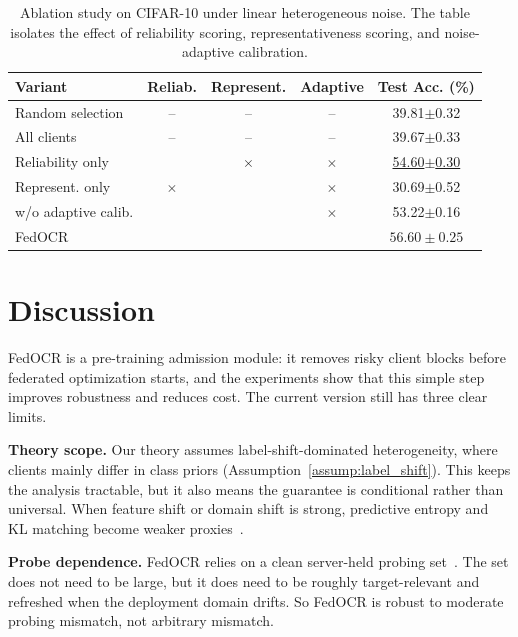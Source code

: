 ﻿\documentclass[conference]{IEEEtran}
\theoremstyle{definition}
\theoremstyle{remark}
\begin{document}
\begin{table}[h]
	\centering
	\caption{\normalfont Ablation study on CIFAR-10 under linear heterogeneous noise. The table isolates the effect of reliability scoring, representativeness scoring, and noise-adaptive calibration.}
	\label{tab:ablation_fedraa}
	\setlength{\tabcolsep}{2pt}
	\renewcommand{\arraystretch}{1.15}
	\begin{tabular}{lcccc}
		\toprule
		\textbf{Variant} 
		& \textbf{Reliab.} 
		& \textbf{Represent.} 
		& \textbf{Adaptive} 
		& \textbf{Test Acc. (\%)} \\
		\midrule
		
		Random selection     & -- & -- & -- & 39.81$\pm$0.32 \\
		All clients          & -- & -- & -- & 39.67$\pm$0.33 \\
		Reliability only     & \checkmark & $\times$ & $\times$ & \underline{54.60$\pm$0.30} \\
		Represent. only      & $\times$ & \checkmark & $\times$ & 30.69$\pm$0.52 \\
		w/o adaptive calib.  & \checkmark & \checkmark & $\times$ & 53.22$\pm$0.16 \\
		\midrule
		FedOCR               & \checkmark & \checkmark & \checkmark & $\boldsymbol{56.60\pm0.25}$ \\
		
		\bottomrule
	\end{tabular}
\end{table}
\section{Discussion}

FedOCR is a pre-training admission module: it removes risky client blocks before federated optimization starts, and the experiments show that this simple step improves robustness and reduces cost. The current version still has three clear limits.

\textbf{Theory scope.} Our theory assumes label-shift-dominated heterogeneity, where clients mainly differ in class priors (Assumption~\ref{assump:label_shift}). This keeps the analysis tractable, but it also means the guarantee is conditional rather than universal. When feature shift or domain shift is strong, predictive entropy and KL matching become weaker proxies~\cite{northcutt2021confident,guo2017calibration,ben2010theory,lipton2018labelshift}.

\textbf{Probe dependence.} FedOCR relies on a clean server-held probing set~\cite{mcmahan2017communication,kairouz2021advances}. The set does not need to be large, but it does need to be roughly target-relevant and refreshed when the deployment domain drifts. So FedOCR is robust to moderate probing mismatch, not arbitrary mismatch.
\end{document}
